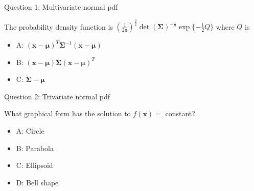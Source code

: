 \documentclass[
  ignorenonframetext,
]{beamer}
\providecommand{\tightlist}{%
  \setlength{\itemsep}{0pt}\setlength{\parskip}{0pt}}
\begin{document}
\begin{frame}
\begin{block}{Question 1: Multivariate normal pdf}
\protect\hypertarget{question-1-multivariate-normal-pdf}{}
\vspace{2mm}

The probability density function is
\((\frac{1}{2\pi})^\frac{p}{2}\det(\boldsymbol\Sigma)^{-\frac{1}{2}}\exp\{-\frac{1}{2}Q\}\)
where \(Q\) is

\vspace{2mm}

\begin{itemize}
\tightlist
\item
  A:
  \((\boldsymbol{x}-\boldsymbol{\mu})^T\boldsymbol\Sigma^{-1}(\boldsymbol{x}-\boldsymbol{\mu})\)
\item
  B:
  \((\boldsymbol{x}-\boldsymbol{\mu})\boldsymbol\Sigma(\boldsymbol{x}-\boldsymbol{\mu})^T\)
\item
  C: \(\boldsymbol\Sigma-\boldsymbol{\mu}\)
\end{itemize}
\end{block}
\end{frame}

\begin{frame}
\begin{block}{Question 2: Trivariate normal pdf}
\protect\hypertarget{question-2-trivariate-normal-pdf}{}
\vspace{2mm}

What graphical form has the solution to \(f(\boldsymbol{x})=\) constant?

\vspace{2mm}

\begin{itemize}
\tightlist
\item
  A: Circle
\item
  B: Parabola
\item
  C: Ellipsoid
\item
  D: Bell shape
\end{itemize}
\end{block}
\end{frame}
\end{document}
